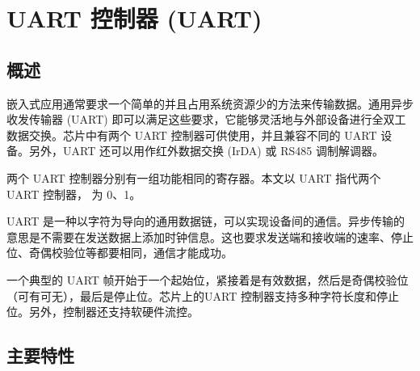 \documentclass[main\_\_CN.tex]{subfiles}
\begin{document}

\ifglobal
\else
    {\let\clearpage\relax \listoftodos}
    {\let\clearpage\relax \listofdonetodos}
    \tableofcontents
\fi



\hypertarget{uart}{}
\chapter{UART 控制器 (UART)}
\label{mod:uart}

\section{概述}

嵌入式应用通常要求一个简单的并且占用系统资源少的方法来传输数据。通用异步收发传输器 (UART) 即可以满足这些要求，它能够灵活地与外部设备进行全双工数据交换。芯片中有两个 UART 控制器可供使用，并且兼容不同的 UART 设备。另外，UART 还可以用作红外数据交换 (IrDA) 或 RS485 调制解调器。

两个 UART 控制器分别有一组功能相同的寄存器。本文以 UART 指代两个 UART 控制器， 为 0、1。

UART 是一种以字符为导向的通用数据链，可以实现设备间的通信。异步传输的意思是不需要在发送数据上添加时钟信息。这也要求发送端和接收端的速率、停止位、奇偶校验位等都要相同，通信才能成功。

一个典型的 UART 帧开始于一个起始位，紧接着是有效数据，然后是奇偶校验位（可有可无），最后是停止位。芯片上的UART 控制器支持多种字符长度和停止位。另外，控制器还支持软硬件流控。

\section{主要特性}
\end{document}
